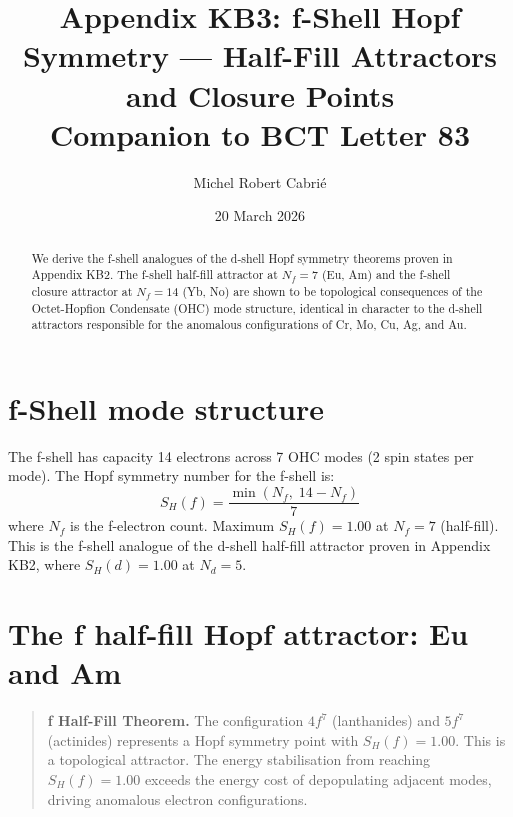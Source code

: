 \documentclass[aps,prl,onecolumn,superscriptaddress]{revtex4-2}
\begin{document}
\title{Appendix KB3: f-Shell Hopf Symmetry ---
Half-Fill Attractors and Closure Points\\
\normalsize Companion to BCT Letter 83}

\author{Michel Robert Cabri\'{e}}

\date{20 March 2026}

\begin{abstract}
We derive the f-shell analogues of the d-shell Hopf symmetry theorems
proven in Appendix KB2. The f-shell half-fill attractor at $N_f = 7$
(Eu, Am) and the f-shell closure attractor at $N_f = 14$ (Yb, No)
are shown to be topological consequences of the Octet-Hopfion
Condensate (OHC) mode structure, identical in character to the
d-shell attractors responsible for the anomalous configurations
of Cr, Mo, Cu, Ag, and Au.
\end{abstract}

\maketitle

\section{f-Shell mode structure}

The f-shell has capacity 14 electrons across 7 OHC modes
(2 spin states per mode). The Hopf symmetry number for the f-shell is:
%
\begin{equation}
  S_H(f) = \frac{\min(N_f,\; 14 - N_f)}{7}
\end{equation}
%
where $N_f$ is the f-electron count. Maximum $S_H(f) = 1.00$ at
$N_f = 7$ (half-fill). This is the f-shell analogue of the d-shell
half-fill attractor proven in Appendix KB2, where
$S_H(d) = 1.00$ at $N_d = 5$.

\section{The f half-fill Hopf attractor: Eu and Am}

\begin{quotation}
\textbf{f Half-Fill Theorem.}
The configuration $4f^7$ (lanthanides) and $5f^7$ (actinides)
represents a Hopf symmetry point with $S_H(f) = 1.00$.
This is a topological attractor. The energy stabilisation from
reaching $S_H(f) = 1.00$ exceeds the energy cost of depopulating
adjacent modes, driving anomalous electron configurations.
\end{quotation}
\end{document}
